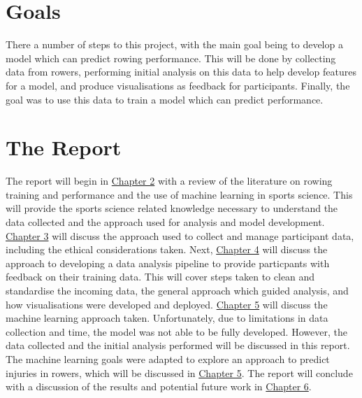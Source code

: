 
\section{Goals}
There a number of steps to this project, with the main goal being to develop a model which can predict rowing performance. This will be done by collecting data from rowers, performing initial analysis on this data to help develop features for a model, and produce visualisations as feedback for participants. Finally, the goal was to use this data to train a model which can predict performance. 

\section{The Report}
The report will begin in \hyperref[ch:background]{Chapter 2} with a review of the literature on rowing training and performance and the use of machine learning in sports science. This will provide the sports science related knowledge necessary to understand the data collected and the approach used for analysis and model development. \hyperref[ch:data-collect-mng]{Chapter 3} will discuss the approach used to collect and manage participant data, including the ethical considerations taken. Next, \hyperref[ch:data-anyl-viz]{Chapter 4} will discuss the approach to developing a data analysis pipeline to provide particpants with feedback on their training data. This will cover steps taken to clean and standardise the incoming data, the general approach which guided analysis, and how visualisations were developed and deployed. \hyperref[ch:ml]{Chapter 5} will discuss the machine learning approach taken. Unfortunately, due to limitations in data collection and time, the model was not able to be fully developed. However, the data collected and the initial analysis performed will be discussed in this report. The machine learning goals were adapted to explore an approach to predict injuries in rowers, which will be discussed in \hyperref[ch:ml]{Chapter 5}. The report will conclude with a discussion of the results and potential future work in \hyperref[ch:discussion]{Chapter 6}.
